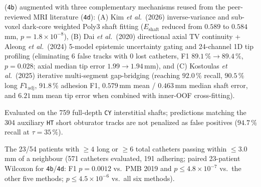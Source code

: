 \begin{table}[tbp]
\begin{threeparttable}
\begin{tablenotes}[flushleft]
\item[i] \NF{} (\texttt{4b}) augmented with three complementary mechanisms reused from the peer-reviewed MRI literature (\texttt{4d}): (A) Kim \emph{et al.}\ (2026) inverse-variance and sub-voxel dark-core weighted Poly3 shaft fitting ($E_{\text{shaft}}$ reduced from $0.589$ to $0.584$\,mm, $p = 1.8\times 10^{-8}$), (B) Dai \emph{et al.}\ (2020) directional axial TV continuity + Aleong \emph{et al.}\ (2024) 5-model epistemic uncertainty gating and 24-channel 1D tip profiling (eliminating 6 false tracks with 0 lost catheters, F1 $89.1\,\% \to 89.4\,\%$, $p = 0.028$; axial median tip error $1.99 \to 1.94$\,mm), and (C) Kostoulas \emph{et al.}\ (2025) iterative multi-segment gap-bridging (reaching $92.0\,\%$ recall, $90.5\,\%$ long $F1_{\text{adj}}$, $91.8\,\%$ adhesion F1, $0.579$\,mm mean / $0.463$\,mm median shaft error, and $6.21$\,mm mean tip error when combined with inner-OOF cross-fitting).
\item[j] Evaluated on the 759 full-depth \texttt{CY} interstitial shafts; predictions matching the 304 auxiliary \texttt{HT} short obturator tracks are not penalized as false positives ($94.7\,\%$ recall at $\tau=35\,\%$).
\item[k] The 23/54 patients with $\ge 4$ long or $\ge 6$ total catheters passing within $\le 3.0$\,mm of a neighbour (571 catheters evaluated, 191 adhering; paired 23-patient Wilcoxon for \texttt{4b}/\texttt{4d}: F1 $p = 0.0012$ vs.\ PMB 2019 and $p \le 4.8\times 10^{-7}$ vs.\ the other five methods; \Etip{} $p \le 4.5\times 10^{-6}$ vs.\ all six methods).
\end{tablenotes}
\end{threeparttable}
\end{table}
